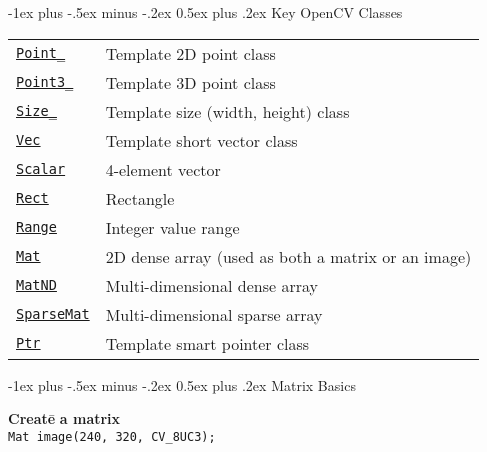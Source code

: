 \documentclass[10pt,landscape]{article}
\makeatletter
\renewcommand{\section}{\@startsection{section}{1}{0mm}%
                                {-1ex plus -.5ex minus -.2ex}%
                                {0.5ex plus .2ex}%
                                {\normalfont\large\bfseries}}
\makeatother
\begin{document}
\begin{multicols}{3}
\section{Key OpenCV Classes}
\begin{tabular}{@{}p{\the\MyLen}%
                @{}p{\linewidth-\the\MyLen}@{}}
\texttt{\href{http://opencv.willowgarage.com/documentation/cpp/basic_structures.html\#Point}{Point\_}} & Template 2D point class \\
\texttt{\href{http://opencv.willowgarage.com/documentation/cpp/basic_structures.html\#Point3}{Point3\_}} & Template 3D point class \\
\texttt{\href{http://opencv.willowgarage.com/documentation/cpp/basic_structures.html\#Size}{Size\_}} & Template size (width, height) class \\
\texttt{\href{http://opencv.willowgarage.com/documentation/cpp/basic_structures.html\#Vec}{Vec}} & Template short vector class \\
\texttt{\href{http://opencv.willowgarage.com/documentation/cpp/basic_structures.html\#Scalar}{Scalar}} & 4-element vector \\
\texttt{\href{http://opencv.willowgarage.com/documentation/cpp/basic_structures.html\#Rect}{Rect}} & Rectangle \\
\texttt{\href{http://opencv.willowgarage.com/documentation/cpp/basic_structures.html\#Range}{Range}} & Integer value range \\
\texttt{\href{http://opencv.willowgarage.com/documentation/cpp/basic_structures.html\#Mat}{Mat}} & 2D dense array (used as both a matrix or an image)\\
\texttt{\href{http://opencv.willowgarage.com/documentation/cpp/basic_structures.html\#MatND}{MatND}} & Multi-dimensional dense array \\
\texttt{\href{http://opencv.willowgarage.com/documentation/cpp/basic_structures.html\#SparseMat}{SparseMat}} & Multi-dimensional sparse array \\
\texttt{\href{http://opencv.willowgarage.com/documentation/cpp/basic_structures.html\#Ptr}{Ptr}} & Template smart pointer class
\end{tabular}

\section{Matrix Basics}
\begin{tabbing}

\textbf{Cr}\=\textbf{ea}\=\textbf{te}\={} \textbf{a matrix} \\
\> \texttt{Mat image(240, 320, CV\_8UC3);} \\


\end{tabbing}
\end{multicols}
\end{document}
